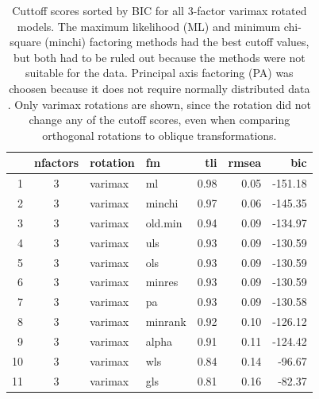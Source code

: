 \documentclass[020-persona\_validation.tex]{subfiles}
\begin{document}
        \begin{table}[!hbtp]
            \centering
            \caption[Factoring methods for 3-factor model cutoffs]
            {Cuttoff scores sorted by BIC for all 3-factor varimax rotated models.
             The maximum likelihood (ML) and minimum chi-square (minchi) factoring methods
             had the best cutoff values,
             but both had to be ruled out because the methods were not suitable for the data.
             Principal axis factoring (PA) was choosen because it does not require normally distributed data
             \cite{arifinExploratoryFactorAnalysis2017, brownConfirmatoryFactorAnalysis2015}.
             Only varimax rotations are shown, since the rotation did not change any of the cutoff scores,
             even when comparing orthogonal rotations to oblique transformations.
            }
            \begin{tabular}{rcllrrr}
                \hline
                & nfactors & rotation & fm & tli & rmsea & bic \\
                \hline
                1 &   3 & varimax & ml & 0.98 & 0.05 & -151.18 \\
                2 &   3 & varimax & minchi & 0.97 & 0.06 & -145.35 \\
                3 &   3 & varimax & old.min & 0.94 & 0.09 & -134.97 \\
                4 &   3 & varimax & uls & 0.93 & 0.09 & -130.59 \\
                5 &   3 & varimax & ols & 0.93 & 0.09 & -130.59 \\
                6 &   3 & varimax & minres & 0.93 & 0.09 & -130.59 \\
                7 &   3 & varimax & pa & 0.93 & 0.09 & -130.58 \\
                8 &   3 & varimax & minrank & 0.92 & 0.10 & -126.12 \\
                9 &   3 & varimax & alpha & 0.91 & 0.11 & -124.42 \\
                10 &   3 & varimax & wls & 0.84 & 0.14 & -96.67 \\
                11 &   3 & varimax & gls & 0.81 & 0.16 & -82.37 \\
                \hline
            \end{tabular}
            \label{tab:all-good-3fa-varimax-models} %
        \end{table}
\end{document}
